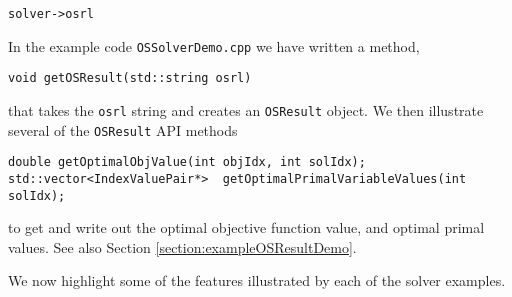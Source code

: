 \begin{itemize}
\begin{verbatim}
solver->osrl
\end{verbatim}


In the example code {\tt OSSolverDemo.cpp} we have written a method,  

\begin{verbatim}
void getOSResult(std::string osrl)
\end{verbatim}

that takes the {\tt osrl} string and creates an {\tt OSResult} object.   
We then illustrate several of the {\tt OSResult} API methods 

\begin{verbatim}
double getOptimalObjValue(int objIdx, int solIdx);
std::vector<IndexValuePair*>  getOptimalPrimalVariableValues(int solIdx);
\end{verbatim}
to get and write out the optimal objective function value, and optimal primal values.  See also Section \ref{section:exampleOSResultDemo}.

\end{itemize}

We now highlight some of the features illustrated by each of the solver examples.


